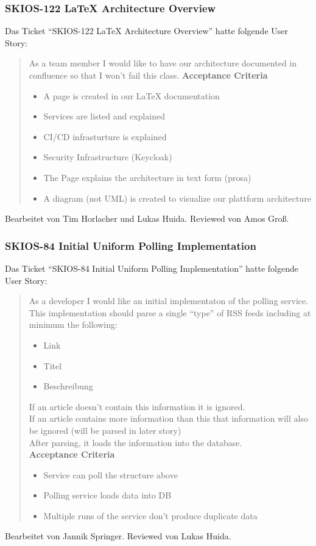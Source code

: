 \subsubsection{SKIOS-122 LaTeX Architecture Overview}
Das Ticket \enquote{SKIOS-122 LaTeX Architecture Overview} hatte folgende User Story:
\begin{quotation}
    As a team member I would like to have our architecture documented in confluence so that I won’t fail this class.
\textbf{Acceptance Criteria}
\begin{itemize}
    \item A page is created in our LaTeX documentation
    \item Services are listed and explained
    \item CI/CD infrasturture is explained
    \item Security Infrastructure (Keycloak)
    \item The Page explains the architecture in text form (prosa) 
    \item A diagram (not UML) is created to visualize our plattform architecture
\end{itemize}
\end{quotation}
Bearbeitet von Tim Horlacher und Lukas Huida.
Reviewed von Amos Groß.

\subsubsection{SKIOS-84 Initial Uniform Polling Implementation}
Das Ticket \enquote{SKIOS-84 Initial Uniform Polling Implementation} hatte folgende User Story:
\begin{quotation}
    As a developer I would like an initial implementaton of the polling service.\\
    This implementation should parse a single \enquote{type} of RSS feeds including at minimum the following:
    
    \begin{itemize}
        \item Link
        \item Titel
        \item Beschreibung
    \end{itemize}

    If an article doesn't contain this information it is ignored.\\
    If an article contains more information than this that information will also be ignored (will be parsed in later story)\\
    After parsing, it loads the information into the database. \\
\textbf{Acceptance Criteria}
\begin{itemize}
    \item Service can poll the structure above
    \item Polling service loads data into DB
    \item Multiple runs of the service don't produce duplicate data
\end{itemize}
\end{quotation}
Bearbeitet von Jannik Springer.
Reviewed von Lukas Huida.


